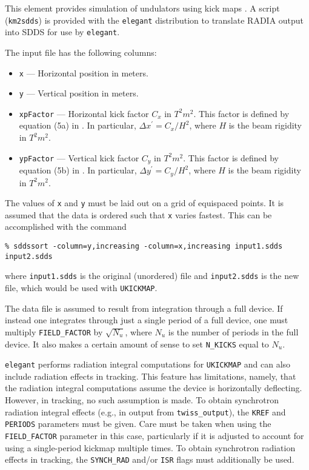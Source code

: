 This element provides simulation of undulators using kick maps \cite{Elleaume1992}.
A script (\verb|km2sdds|) is provided with the {\tt elegant}
distribution to translate RADIA \cite{radia} output into SDDS for use by
\verb|elegant|.

The input file has the following columns:
\begin{itemize}
\item \verb|x| --- Horizontal position in meters.
\item \verb|y| --- Vertical position in meters.
\item \verb|xpFactor| --- Horizontal kick factor $C_x$ in $T^2 m^2$.  This factor is defined by
equation (5a) in \cite{Elleaume1992}.  In particular, $\Delta x^\prime = C_x/H^2$, where
$H$ is the beam rigidity in  $T^2 m^2$.
\item \verb|ypFactor| --- Vertical kick factor $C_y$ in $T^2 m^2$. This factor is defined by
equation (5b) in \cite{Elleaume1992}.  In particular, $\Delta y^\prime = C_y/H^2$, where
$H$ is the beam rigidity in  $T^2 m^2$.
\end{itemize}
The values of \verb|x| and \verb|y| must be laid out on a grid of equispaced points.
It is assumed that the data is ordered such that \verb|x| varies fastest.  This can be
accomplished with the command
\begin{verbatim}
% sddssort -column=y,increasing -column=x,increasing input1.sdds input2.sdds
\end{verbatim}
where \verb|input1.sdds| is the original (unordered) file and \verb|input2.sdds| is the
new file, which would be used with \verb|UKICKMAP|.

The data file is assumed to result from integration through a full device. If instead one
integrates through just a single period of a full device, one must multiply \verb|FIELD_FACTOR|
by $\sqrt{N_u}$, where $N_u$ is the number of periods in the full device.  It also makes
a certain amount of sense to set \verb|N_KICKS| equal to $N_u$.

{\tt elegant} performs radiation integral computations
for \verb|UKICKMAP| and can also include radiation effects in
tracking.  This feature has limitations, namely, that the radiation
integral computations assume the device is horizontally deflecting.
However, in tracking, no such assumption is made.  
To obtain synchrotron radiation integral effects (e.g., in output from \verb|twiss_output|), 
the \verb|KREF| and \verb|PERIODS| parameters must be given.
Care must be taken when using the \verb|FIELD_FACTOR| parameter in this case, particularly if
it is adjusted to account for using a single-period kickmap multiple times.
To obtain synchrotron radiation effects in tracking, the \verb|SYNCH_RAD| and/or \verb|ISR| flags
must additionally be used.

